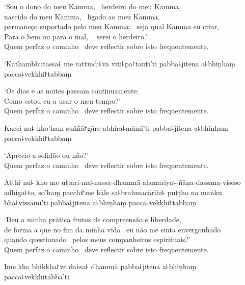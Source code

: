 \begin{english}
  `Sou o dono do meu Kamma, \pause\ herdeiro do meu Kamma, \pause\\
  nascido do meu Kamma, \pause\ ligado ao meu Kamma, \pause\\
  permaneço suportado pelo meu Kamma; \pause\ seja qual Kamma eu criar, \pause\\
  Para o bem ou para o mal, \pause\  serei o herdeiro.' \pause\\
  Quem perfaz o caminho \pause\ deve reflectir sobre isto frequentemente.
\end{english}

\clearpage

`Kathambhūtassa꜕ me rattindi꜕vā vīti꜕pa꜓tantī'ti pabba꜕jitena a꜕bhiṇhaṃ pacca꜕vekkhi꜓tabbaṃ

\begin{english}
  `Os dias e as noites passam continuamente; \pause\\
  Como estou eu a usar o meu tempo?' \pause\\
  Quem perfaz o caminho \pause\ deve reflectir sobre isto frequentemente.
\end{english}

Kacci nu꜕ kho'haṃ suññā꜓gāre abhira꜕māmī'ti pabba꜕jitena a꜕bhiṇhaṃ pacca꜕vekkhi꜓tabbaṃ

\begin{english}
  `Aprecio a solidão ou não?' \pause\\
  Quem perfaz o caminho \pause\ deve reflectir sobre isto frequentemente.
\end{english}

Atthi nu꜕ kho me uttari-ma꜕nussa-dhammā alamariya꜕-ñāṇa-dassana-viseso adhiga꜕to, so'haṃ pacchi꜓me kāle sa꜕brahmacārīhi꜕ puṭṭho na maṅku bha꜕vissāmī'ti pabba꜕jitena a꜕bhiṇhaṃ pacca꜕vekkhi꜓tabbaṃ

\begin{english}
  `Deu a minha prática frutos de compreensão e liberdade, \pause\\ de forma a que
  no fim da minha vida \pause\ eu não me sinta envergonhado \pause\\
  quando questionado \pause\ pelos meus companheiros espirituais?' \pause\\
  Quem perfaz o caminho \pause\ deve reflectir sobre isto frequentemente.
\end{english}

Ime kho bhikkha꜓ve da꜕sa꜕ dhammā pabba꜕jitena a꜕bhiṇhaṃ pacca꜕vekkhitabbā'ti

